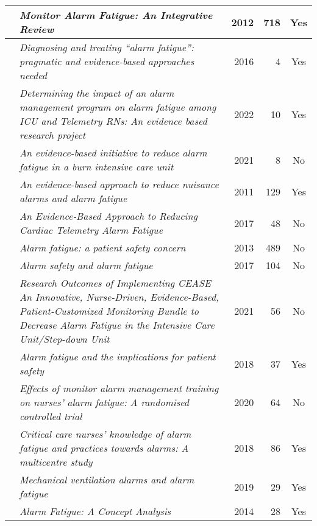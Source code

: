 \documentclass[]{report}
\begin{document}
\begin{longtable}{
			|>{\raggedright\arraybackslash}p{3.7cm}
			|>{\raggedright\arraybackslash}p{3.7cm}
			|r
			|r
			|c
			|}
		\citet{cvach2012monitor} & \textit{Monitor Alarm Fatigue: An Integrative Review} & 2012 & 718 & Yes \\
		\hline
		\citet{rayo2016diagnosing} & \textit{Diagnosing and treating “alarm fatigue”: pragmatic and evidence-based approaches needed} & 2016 & 4 & Yes \\
		\hline
	    \citet{dee2022determining} & \textit{Determining the impact of an alarm management program on alarm fatigue among ICU and Telemetry RNs: An evidence based research project} & 2022 & 10 & Yes \\
        \hline
		\citet{gorisek2021evidence} & \textit{An evidence-based initiative to reduce alarm fatigue in a burn intensive care unit} & 2021 & 8 & No \\
        \hline
	    \citet{welch2011evidence} & \textit{An evidence-based approach to reduce nuisance alarms and alarm fatigue} & 2011 & 129 & Yes \\
        \hline
	    \citet{srinivasa2017evidence} & \textit{An Evidence‐Based Approach to Reducing Cardiac Telemetry Alarm Fatigue} & 2017 & 48 & No \\
        \hline
		\citet{sendelbach2013alarm} & \textit{Alarm fatigue: a patient safety concern} & 2013 & 489 & No \\
		\hline
		\citet{johnson2017alarm} & \textit{Alarm safety and alarm fatigue} & 2017 & 104 & No \\
	    \hline
		\citet{lewis2019research} & \textit{Research Outcomes of Implementing CEASE
	An Innovative, Nurse-Driven, Evidence-Based, Patient-Customized Monitoring Bundle to Decrease Alarm Fatigue in the Intensive Care Unit/Step-down Unit} & 2021 & 56 & No \\
        \hline
        \citet{oliveira2018alarm} & \textit{Alarm fatigue and the implications for patient safety} & 2018 & 37 & Yes \\
        \hline
        \citet{bi2020effects} & \textit{Effects of monitor alarm management training on nurses' alarm fatigue: A randomised controlled trial} & 2020 & 64 & No \\
        \hline
        \citet{casey2018critical} & \textit{Critical care nurses' knowledge of alarm fatigue and practices towards alarms: A multicentre study} & 2018 & 86 & Yes \\
        \hline
        \citet{scott2019mechanical} & \textit{Mechanical ventilation alarms and alarm fatigue} & 2019 & 29 & Yes \\
        \hline        
		\citet{west2014alarm} & \textit{Alarm Fatigue: A Concept Analysis} & 2014 & 28 & Yes \\

\end{longtable}
\end{document}
